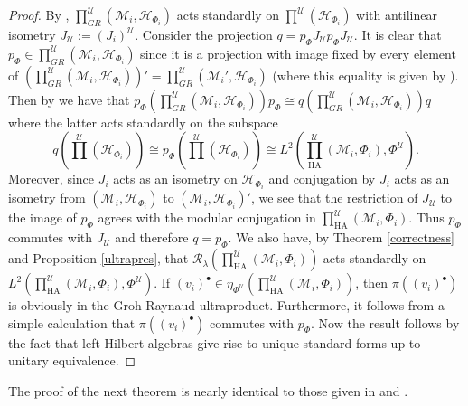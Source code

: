 \documentclass[12pt]{amsart}
\theoremstyle{definition}
\def\cal{\mathcal}
\newcommand\cU{{\cal U}}
\newcommand\R{{\cal R}}
\def \HA{\operatorname{HA}}
\begin{document}
\begin{proof}
    By \cite[Theorem 3.18]{AH}, $\prod^{\cU}_{GR} (\cal M_i, \cal H_{\Phi_i})$ acts standardly on $\prod^{\cU} (\cal H_{\Phi_i})$ with antilinear isometry $J_{\cU} := (J_i)^{\cU}$.  Consider the projection $q = p_{\Phi}J_{\cU}p_{\Phi}J_{\cU}$.  It is clear that $p_{\Phi} \in \prod^{\cU}_{GR} (\cal M_i, \cal H_{\Phi_i})$ since it is a projection with image fixed by every element of $\left(\prod^{\cU}_{GR} (\cal M_i, \cal H_{\Phi_i})\right)' = \prod^{\cU}_{GR} (\cal M_i', \cal H_{\Phi_i})$ (where this equality is given by \cite[Theorem 3.22]{AH}).  Then by \cite[Lemma 2.6]{Ha75} we have that $p_{\Phi}\left( \prod^{\cU}_{GR} (\cal M_i, \cal H_{\Phi_i})\right)p_{\Phi} \cong q\left(\prod^{\cU}_{GR} (\cal M_i, \cal H_{\Phi_i})\right)q$ where the latter acts standardly on the subspace 
    \[
    q\left(\prod^{\cU}( \cal H_{\Phi_i})\right) \cong p_{\Phi}\left( \prod^{\cU} (\cal H_{\Phi_i})\right) \cong L^2\left(\prod_{\HA}^{\cU}(\cal M_i, \Phi_i),\Phi^\cU\right).
    \]
    Moreover, since $J_i$ acts as an isometry on $\cal H_{\Phi_i}$ and conjugation by $J_i$ acts as an isometry from $(\cal M_i, \cal H_{\Phi_i})$ to $(\cal M_i, \cal H_{\Phi_i})'$, we see that the restriction of $J_{\cU}$ to the image of $p_{\Phi}$ agrees with the modular conjugation in $\prod_{\HA}^{\cU}(\cal M_i, \Phi_i)$.  Thus $p_{\Phi}$ commutes with $J_{\cU}$ and therefore $q = p_{\Phi}$.  We also have, by Theorem \ref{correctness} and Proposition \ref{ultrapres}, that $\R_{\lambda}\left(\prod_{\HA}^{\cU}(\cal M_i, \Phi_i)\right)$ acts standardly on $L^2\left(\prod_{\HA}^{\cU}(\cal M_i, \Phi_i),\Phi^\cU\right)$.  If $(v_i)^\bullet \in \eta_{\Phi^{\cU}}\left(\prod_{\HA}^{\cU}(\cal M_i, \Phi_i)\right)$, then $\pi((v_i)^\bullet)$ is obviously in the Groh-Raynaud ultraproduct.  Furthermore, it follows from a simple calculation that $\pi((v_i)^\bullet)$ commutes with $p_{\Phi}$.  Now the result follows by the fact that left Hilbert algebras give rise to unique standard forms up to unitary equivalence.
\end{proof}

The proof of the next theorem is nearly identical to those given in \cite[Proposition 4.11]{AH} and \cite[Theorem 1.5]{MT}.
\end{document}
